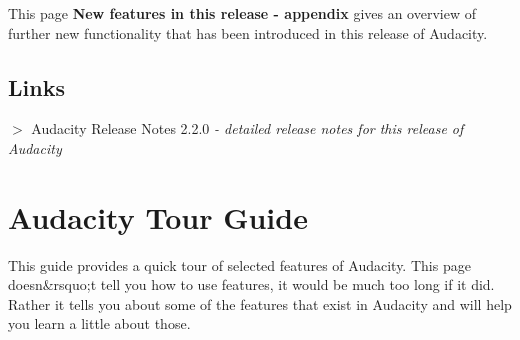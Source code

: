 \documentclass[twocolumn]{book}
\begin{document}
This page \textbf{New features in this release - appendix} gives an overview of further new functionality that has been introduced in this release of Audacity.



\section{Links}


\textbf{\mbox{$>$}} Audacity Release Notes 2.2.0 \textit{- detailed release notes for this release of Audacity}%
% 
%  
% 
%  

											
																					
\chapter{Audacity Tour Guide}

\label{f42}																																	%
					

This guide provides a quick tour of selected features of Audacity.  This page doesn\&rsquo;t tell you how to use features, it would be much too long if it did.  Rather it tells you about some of the features that exist in Audacity and will help you learn a little about those.
\end{document}
